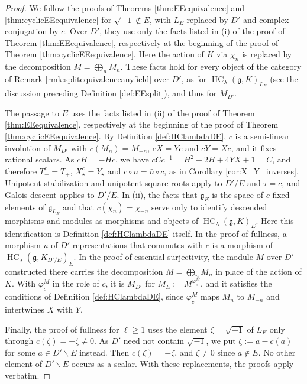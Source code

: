 \documentclass[a4paper,12pt,reqno]{amsart}
\DeclareMathOperator{\HC}{\mathrm{HC}}
\theoremstyle{plain}
\theoremstyle{remark}
\begin{document}
    \begin{proof}
    We follow the proofs of Theorems \ref{thm:EEequivalence} and \ref{thm:cyclicEEequivalence} for $\sqrt{-1}\not\in E$, with $L_E$ replaced by $D'$ and complex conjugation by $c$. Over $D'$, they use only the facts listed in (i) of the proof of Theorem \ref{thm:EEequivalence}, respectively at the beginning of the proof of Theorem \ref{thm:cyclicEEequivalence}. Here the action of $K$ via $\chi_n$ is replaced by the decomposition $M=\bigoplus_nM_n$. These facts hold for every object of the category of Remark \ref{rmk:splitequivalenceanyfield} over $D'$, as for $\HC_\lambda(\mathfrak{g},K)_{L_E}$ (see the discussion preceding Definition \ref{def:EEsplit}), and thus for $M_{D'}$.

    The passage to $E$ uses the facts listed in (ii) of the proof of Theorem \ref{thm:EEequivalence}, respectively at the beginning of the proof of Theorem \ref{thm:cyclicEEequivalence}. By Definition \ref{def:HClambdaDE}, $c$ is a semi-linear involution of $M_{D'}$ with $c(M_n)=M_{-n}$, $cX=Yc$ and $cY=Xc$, and it fixes rational scalars. As $cH=-Hc$, we have $cCc^{-1}=H^2+2H+4YX+1=C$, and therefore $T_-^c=T_+$, $X_\star^c=Y_\star$ and $c\circ n=\bar n\circ c$, as in Corollary \ref{cor:X_Y_inverses}. Unipotent stabilization and unipotent square roots apply to $D'/E$ and $\tau=c$, and Galois descent applies to $D'/E$. In (ii), the facts that $\mathfrak{g}_E$ is the space of $c$-fixed elements of $\mathfrak{g}_{L_E}$ and that $c(\chi_n)=\chi_{-n}$ serve only to identify descended morphisms and modules as morphisms and objects of $\HC_\lambda(\mathfrak{g},K)_E$. Here this identification is Definition \ref{def:HClambdaDE} itself. In the proof of fullness, a morphism $u$ of $D'$-representations that commutes with $c$ is a morphism of $\HC_\lambda(\mathfrak{g},K_{D'/E})_E$. In the proof of essential surjectivity, the module $M$ over $D'$ constructed there carries the decomposition $M=\bigoplus_nM_n$ in place of the action of $K$. With $\varphi_c^M$ in the role of $c$, it is $M_{D'}$ for $M_E:=M^{\varphi_c^M}$, and it satisfies the conditions of Definition \ref{def:HClambdaDE}, since $\varphi_c^M$ maps $M_n$ to $M_{-n}$ and intertwines $X$ with $Y$.

    Finally, the proof of fullness for $\ell\geq1$ uses the element $\zeta=\sqrt{-1}$ of $L_E$ only through $c(\zeta)=-\zeta\neq0$. As $D'$ need not contain $\sqrt{-1}$, we put $\zeta:=a-c(a)$ for some $a\in D'\smallsetminus E$ instead. Then $c(\zeta)=-\zeta$, and $\zeta\neq0$ since $a\not\in E$. No other element of $D'\smallsetminus E$ occurs as a scalar. With these replacements, the proofs apply verbatim.
    \end{proof}
\end{document}
